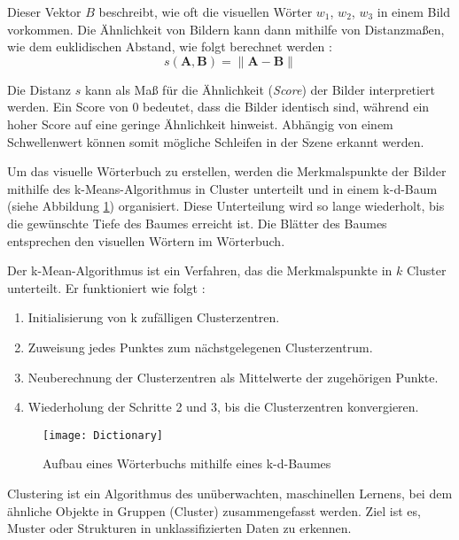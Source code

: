 Dieser Vektor \( B \) beschreibt, wie oft die visuellen Wörter \( w_1 \), \( w_2 \), \( w_3 \) in einem Bild vorkommen. Die Ähnlichkeit von Bildern kann dann mithilfe von Distanzmaßen, wie dem euklidischen Abstand, wie folgt berechnet werden \cite{gao2021vSLAM}:
\begin{equation}
    s(\mathbf{A}, \mathbf{B}) = \|\mathbf{A} - \mathbf{B}\|
\end{equation}

Die Distanz \( s \) kann als Maß für die Ähnlichkeit (\emph{Score}) der Bilder interpretiert werden. Ein Score von 0 bedeutet, dass die Bilder identisch sind, während ein hoher Score auf eine geringe Ähnlichkeit hinweist. Abhängig von einem Schwellenwert können somit mögliche Schleifen in der Szene erkannt werden. \cite{gao2021vSLAM}

Um das visuelle Wörterbuch zu erstellen, werden die Merkmalspunkte der Bilder mithilfe des k-Means-Algorithmus in Cluster unterteilt und in einem k-d-Baum (siehe Abbildung \ref{fig:Dictionary}) organisiert. Diese Unterteilung wird so lange wiederholt, bis die gewünschte Tiefe des Baumes erreicht ist. Die Blätter des Baumes entsprechen den visuellen Wörtern im Wörterbuch. \cite{gao2021vSLAM}

Der k-Mean-Algorithmus ist ein Verfahren, das die Merkmalspunkte in \( k \) Cluster unterteilt. Er funktioniert wie folgt \cite{teynor2024ml}:

\begin{enumerate}
    \item Initialisierung von k zufälligen Clusterzentren.
    \item Zuweisung jedes Punktes zum nächstgelegenen Clusterzentrum.
    \item Neuberechnung der Clusterzentren als Mittelwerte der zugehörigen Punkte.
    \item Wiederholung der Schritte 2 und 3, bis die Clusterzentren konvergieren.
\end{enumerate}

\begin{figure}
    \centering
    \texttt{[image: Dictionary]}
    \caption{Aufbau eines Wörterbuchs mithilfe eines k-d-Baumes \cite{gao2021vSLAM}\label{fig:Dictionary}}\par
\end{figure}

\begin{tcolorbox}[colback=THAi-Blue!20!white, colframe=THAi-Blue]
    Clustering ist ein Algorithmus des unüberwachten, maschinellen Lernens, bei dem ähnliche Objekte in Gruppen (Cluster) zusammengefasst werden. Ziel ist es, Muster oder Strukturen in unklassifizierten Daten zu erkennen. \cite{wikipedia2025clusteranalyse}
\end{tcolorbox}

